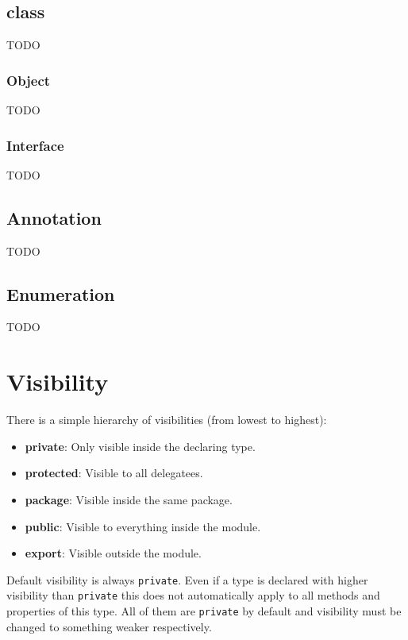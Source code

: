 \documentclass[11pt,a4paper]{report}
\begin{document}
\subsection{class}

TODO

\subsubsection{Object}

TODO

\subsubsection{Interface}

TODO

\subsection{Annotation}

TODO

\subsection{Enumeration}

TODO

\section{Visibility}

There is a simple hierarchy of visibilities (from lowest to highest):

\begin{itemize}
    \item \textbf{private}: Only visible inside the declaring type.
    \item \textbf{protected}: Visible to all delegatees.
    \item \textbf{package}: Visible inside the same package.
    \item \textbf{public}: Visible to everything inside the module.
    \item \textbf{export}: Visible outside the module.
\end{itemize}

Default visibility is always \texttt{private}. Even if a type is declared with higher visibility than \texttt{private} this does not automatically apply to all methods and properties of this type. All of them are \texttt{private} by default and visibility must be changed to something weaker respectively.
\end{document}
